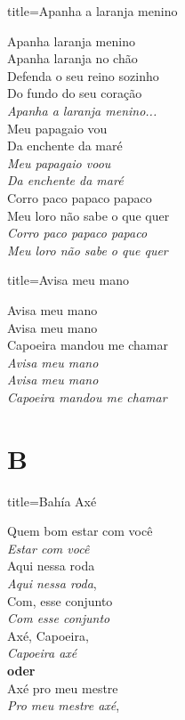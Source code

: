 \documentclass[fontsize=14pt, paper=a4, twoside, DIV=20]{scrreprt} %
\newcommand\chapTOC[1]{
    \chapter*{#1}
    \addcontentsline{toc}{chapter}{#1}
    \markboth{#1}{#1}}
\begin{document}
\begin{multicols*}{2}
\begin{song}{title={Apanha a laranja menino}}
    \begin{verse*}
        Apanha laranja menino\\
        Apanha laranja no chão\\
        Defenda o seu reino sozinho\\
        Do fundo do seu coração\\

        \textit{Apanha a laranja menino...}\\
        Meu papagaio vou\\
        Da enchente da maré\\
        \textit{Meu papagaio voou}\\
        \textit{Da enchente da maré}\\
        Corro paco papaco papaco\\
        Meu loro não sabe o que quer\\
        \textit{Corro paco papaco papaco}\\
        \textit{Meu loro não sabe o que quer}\\
    \end{verse*}
\end{song}

\begin{song}{title={Avisa meu mano}}
    \begin{verse*}
       Avisa meu mano  \\
       Avisa meu mano  \\
       Capoeira mandou me chamar \\

       \textit{Avisa meu mano} \\
       \textit{Avisa meu mano} \\
       \textit{Capoeira mandou me chamar}\\
    \end{verse*}
     \end{song}
\newpage
\chapTOC{B}


\begin{song}{title={Bahía Axé}}
    \begin{verse*}
        Quem bom estar com você\\
        \textit{Estar com você}\\
        Aqui nessa roda\\
        \textit{Aqui nessa roda},\\
        Com, esse conjunto\\
        \textit{Com esse conjunto}\\
        Axé, Capoeira, \\
        \textit{Capoeira axé}\\
        \textbf{oder} \\
        Axé pro meu mestre\\
        \textit{Pro meu mestre axé},\\


\end{verse*}
\end{song}
\end{multicols*}
\end{document}
